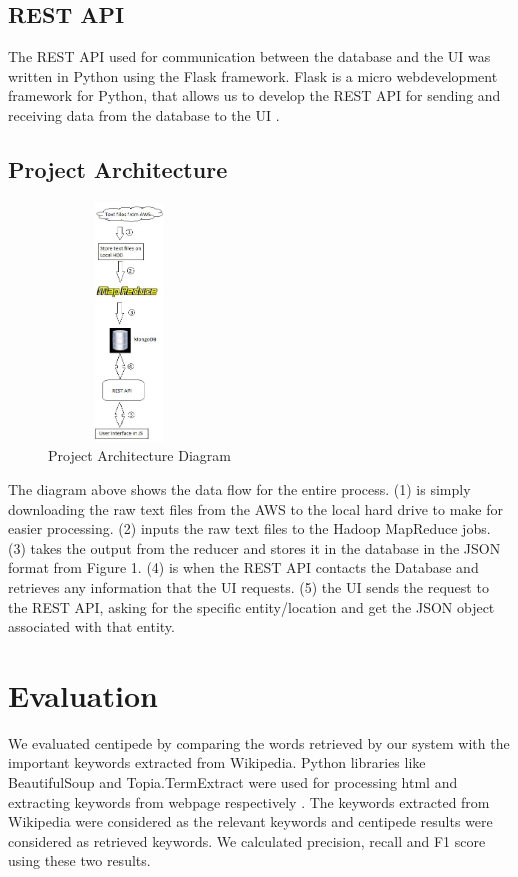 \documentclass[conference]{IEEEtran}
\begin{document}
\subsection{REST API}

The REST API used for communication between the database and the UI was written in Python using the Flask framework. Flask is a micro webdevelopment framework for Python, that allows us to develop the REST API for sending and receiving data from the database to the UI \cite{ronacher:flask}. 


\subsection{Project Architecture}

\begin{figure}[h]
\includegraphics[height=2.5in, width=1.7in]{software_architecture.jpg}
\caption{Project Architecture Diagram}
\label{archi}
\end{figure}

The diagram above shows the data flow for the entire process. (1) is simply downloading the raw text files from the AWS to the local hard drive to make for easier processing. (2) inputs the raw text files to the Hadoop MapReduce jobs. (3) takes the output from the reducer and stores it in the database in the JSON format from Figure 1. (4) is when the REST API contacts the Database and retrieves any information that the UI requests. (5) the UI sends the request to the REST API, asking for the specific entity/location and get the JSON object associated with that entity. 

\section{Evaluation}

We evaluated centipede by comparing the words retrieved by our system with the important keywords extracted from Wikipedia. Python libraries like BeautifulSoup and Topia.TermExtract were used for processing html and extracting keywords from webpage respectively \cite{scrap:it}.  The keywords extracted from Wikipedia were considered as the relevant keywords and centipede results were considered as retrieved keywords. We calculated precision, recall and F1 score using these two results.
\end{document}
